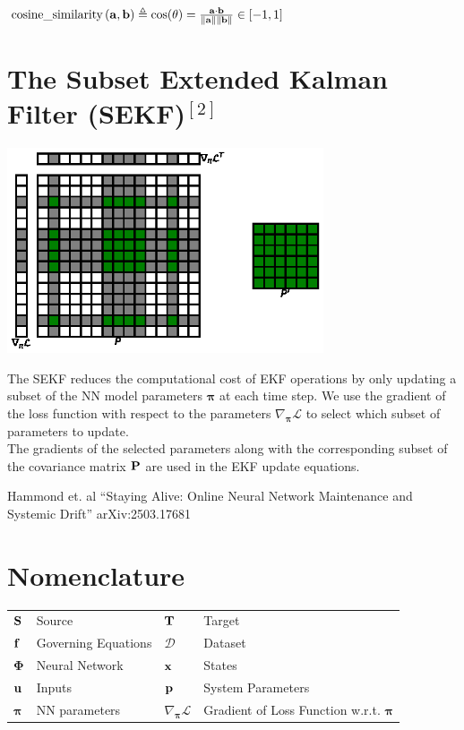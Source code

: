 \documentclass[a0paper,fleqn]{betterposter}
\newcommand{\source}{\mathrm{\bf{S}}}
\newcommand{\target}{\mathrm{\bf{T}}}
\newcommand{\D}{\mathcal{D}}
\newcommand{\nn}{\bm \Phi}
\newcommand{\f}{\mathrm{\bf{f}}}
\newcommand{\footnoteSize}{\fontsize{18}{20} \selectfont}
\begin{document}
{$\text{cosine\_similarity}\left(\bf{a}, \bf{b}\right) \triangleq \cos(\theta) = \frac{\bf{a} \cdot \bf{b}}{\|\bf{a}\| \|\bf{b}\|} \in [-1,1]$
\vfill
\section{The Subset Extended Kalman Filter (SEKF)$^\mathrm{[2]}$}
\vspace{-2em}
\begin{center}
    \includegraphics[width=0.7\textwidth]{img/subset_matrices_mpl}
\end{center}

The SEKF reduces the computational cost of EKF operations by only updating a subset of the NN model parameters $\bm{\pi}$ at each time step. We use the gradient of the loss function with respect to the parameters $\nabla_{\bm{\pi}}\mathcal{L}$ to select which subset of parameters to update.
\\The gradients of the selected parameters along with the corresponding subset of the covariance matrix $\bf{P}$ are used in the EKF update equations.

\vspace{12pt}

{\footnoteSize [2] Hammond et. al ``Staying Alive: Online Neural Network Maintenance and Systemic Drift'' arXiv:2503.17681
\par
}

\vfill

\section{Nomenclature}

\vspace{-2em}
\begin{tabular}{ll|ll}
    $\source$ & Source & $\target$ & Target \\
    $\f$ & Governing Equations & $\D$ & Dataset \\
    $\nn$ & Neural Network & $\bf{x}$  &  States \\
    $\bf{u}$ & Inputs & $\bf{p}$ & System Parameters \\
    $\bm{\pi}$ & NN parameters & $\nabla_{\bm{\pi}}\mathcal{L}$ & Gradient of Loss Function w.r.t. $\bm{\pi}$ \\
\end{tabular}

}
\end{document}
